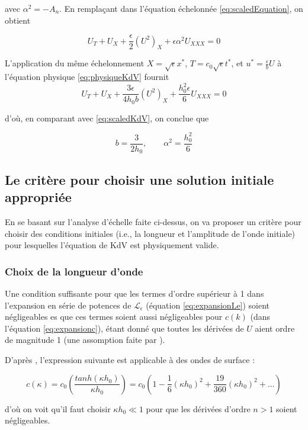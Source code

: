 \noindent avec $\alpha^2 = - A_n$. En remplaçant dans l'équation échelonnée \eqref{eq:scaledEquation}, on obtient

$$U_T + U_X + \frac{\epsilon}{2} (U^2)_X + \epsilon\alpha^2U_{XXX} = 0$$

\indent L'application du même échelonnement $ X=\sqrt{\epsilon}x^*$, $T =c_0 \sqrt{\epsilon} t^*$, et $u^* = \frac{\epsilon}{ b} U$ à l'équation physique \eqref{eq:physiqueKdV} fournit $$U_T + U_X + \frac{3\epsilon}{4h_0b} (U^2)_X + \frac{h_0^2\epsilon}{6}U_{XXX} = 0$$ 

\noindent d'où, en comparant avec  \eqref{eq:scaledKdV}, on conclue que 

\begin{equation}
\label{eq:analysisb}
b = \frac{3}{2h_0}, \qquad \alpha^2 = \frac{h_0^2}{6}
\end{equation} 


\subsection{Le critère pour choisir une solution initiale appropriée}

\indent En se basant sur l'analyse d'échelle faite ci-dessus, on va proposer un critère pour choisir des conditions initiales (i.e., la longueur et l'amplitude de l'onde initiale) pour lesquelles l'équation de KdV est physiquement valide. 

\subsubsection{Choix de la longueur d'onde}

\indent Une condition suffisante pour que les termes d'ordre supérieur à 1 dans l'expansion en série de potences de $\mathcal{L}_\epsilon$  (équation \ref{eq:expansionLe}) soient négligeables es que ces termes soient aussi négligeables pour $c(k)$ (dans l'équation \ref{eq:expansionc}), étant donné que toutes les dérivées de $U$ aient ordre de magnitude 1 (une assomption faite par \cite{BBM1971}).

\indent  D'après \cite{BBM1971}, l'expression suivante est applicable à des ondes de surface :

$$c(\kappa) = c_0 \left(\frac{tanh(\kappa h_0)}{\kappa h_0}\right) = c_0 \left(1 - \frac{1}{6}(\kappa h_0)^2 + \frac{19}{360}(\kappa h_0)^2 + ... \right) $$

\noindent d'où on voit qu'il faut choisir $\kappa h_0 \ll 1$ pour que les dérivées d'ordre $n>1$ soient négligeables.


